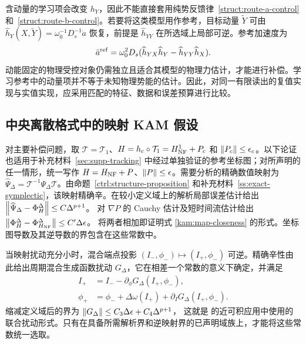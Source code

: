 含动量的学习项会改变 $h_Y$，因此不能直接套用纯势反馈律~\eqref{struct:route-a-control} 和~\eqref{struct:route-b-control}。若要将这类模型用作参考，目标动量 $\widetilde Y$ 可由
$\widehat h_Y(X,\widetilde Y)=\omega_0^{-1}D_s^{-1}\dot a$
恢复，前提是 $\widehat h_{YY}$ 在所选域上局部可逆。参考加速度为
\begin{equation}\label{ss:general-reference-acceleration}
 \ddot a^{\rm ref}=\omega_0^2D_s
    (\widehat h_{YX}\widehat h_Y-\widehat h_{YY}\widehat h_X).
\end{equation}
动能固定的物理受控对象仍需独立且适合其模型的物理力估计，才能进行补偿。学习参考中的动量项并不等于未知物理势能的估计。因此，对同一有限读出的复值实现与实值实现，应采用匹配的特征、数据和误差预算进行比较。

\subsection{中央离散格式中的映射 KAM 假设}
\label{ss:map-kam}

对主要补偿问题，取 $\mathcal T=\mathcal T_1$、$H=h_c\circ\mathcal T_1=H_{\rm NF}^{1}+P_c$ 和 $\left\lVert P_c\right\rVert\le\epsilon_c$。以下论证也适用于补充材料~\ref{sec:supp-tracking} 中经过单独验证的参考坐标图；对所声明的任一情形，统一写作 $H=H_{\rm NF}+P$、$\left\lVert P\right\rVert\le\epsilon$。需要分析的精确数值映射为 $\widehat\Psi_\Delta=\mathcal T^{-1}\Psi_\Delta\mathcal T$。由命题~\ref{ctrl:structure-proposition} 和补充材料~\ref{ss:exact-symplectic}，该映射精确辛。在较小定义域上的解析局部误差估计给出
$\left\lVert\widehat\Psi_\Delta-\Phi_H^\Delta\right\rVert\le C\Delta^{p+1}$。
对 $\nabla P$ 的 Cauchy 估计及短时间流估计给出
$\left\lVert\Phi_H^\Delta-\Phi_{H_{\rm NF}}^\Delta\right\rVert\le C'\Delta\epsilon$。
将两者相加即证明式 \eqref{kam:map-closeness} 的形式。坐标图导数及其逆导数的界包含在这些常数中。

当映射扰动充分小时，混合端点投影 $(I_-,\phi_-)\mapsto(I_+,\phi_-)$ 可逆。精确辛性由此给出周期混合生成函数扰动 $G_\Delta$，它在相差一个常数的意义下确定，并满足
\begin{equation}\label{ss:mixed-map}
\begin{aligned}
 I_+&=I_--\partial_\phi G_\Delta(I_+,\phi_-),\\
 \phi_+&=\phi_-+\Delta\omega(I_+)
                   +\partial_I G_\Delta(I_+,\phi_-).
\end{aligned}
\end{equation}
缩减定义域后的界为
$\left\lVert G_\Delta\right\rVert\le C_3\Delta\epsilon+C_4\Delta^{p+1}$，
这就是 \citet[Section~4]{shang} 的近可积应用中使用的联合扰动形式。只有在具备所需解析界和逆映射界的已声明域族上，才能将这些常数统一选取。

